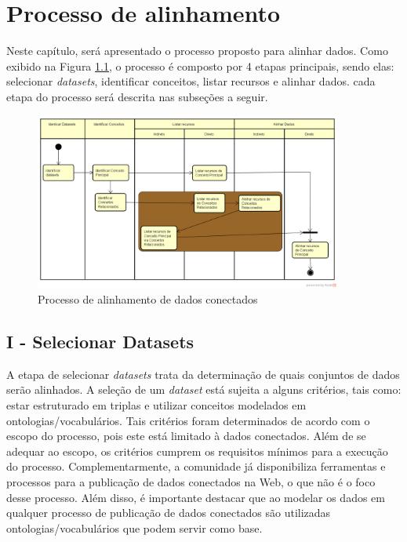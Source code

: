 \chapter{Processo de alinhamento}

Neste capítulo, será apresentado o processo proposto para alinhar dados. Como exibido na Figura \ref{fig:processo}, o processo é composto por 4 etapas principais, sendo elas: selecionar \textit{datasets}, identificar conceitos, listar recursos e alinhar dados. cada etapa do processo será descrita nas subseções a seguir.


\begin{figure}[!ht]
	\centering
	\includegraphics[width=0.9\textwidth]{./imagens/processo.png}
    \caption{Processo de alinhamento de dados conectados}
	\label{fig:processo}
\end{figure}

\section{I - Selecionar Datasets}
A etapa de selecionar \textit{datasets} trata da determinação de quais conjuntos de dados serão alinhados. A seleção de um \textit{dataset} está sujeita a alguns critérios, tais como: estar estruturado em triplas e utilizar conceitos modelados em ontologias/vocabulários. Tais critérios foram determinados de acordo com o escopo do processo, pois este está limitado à dados conectados. Além de se adequar ao escopo, os critérios cumprem os requisitos mínimos para a execução do processo.
Complementarmente, a comunidade já disponibiliza ferramentas e processos para a publicação de dados conectados na Web, o que não é o foco desse processo. Além disso, é importante destacar que ao modelar os dados em qualquer processo de publicação de dados conectados são utilizadas ontologias/vocabulários que podem servir como base.

